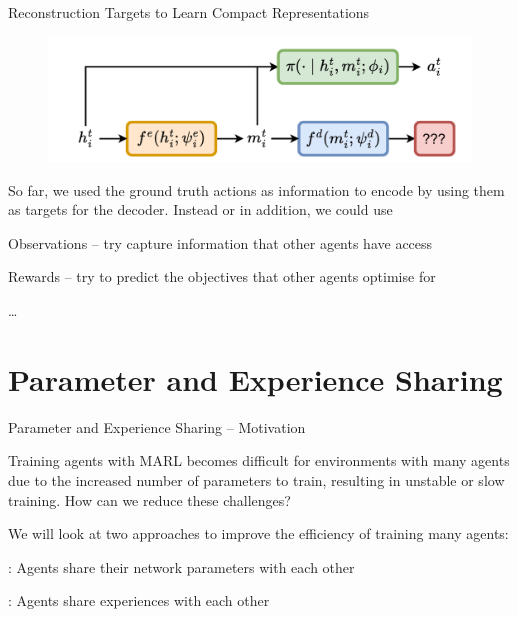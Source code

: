 \begin{frame}[t]{Reconstruction Targets to Learn Compact Representations}
    \begin{figure}
        \centering
        \includegraphics[width=.65\textwidth]{images/agent_modelling_encoder_decoder_targets.pdf}
    \end{figure}

    \vspace{-2em}

    \begin{notebox}
        So far, we used the ground truth actions as information to encode by using them as targets for the decoder. Instead or in addition, we could use
        \blist
            \item Observations -- try capture information that other agents have access
            \item Rewards -- try to predict the objectives that other agents optimise for
            \item \ldots
        \elist
    \end{notebox}
\end{frame}

\section{Parameter and Experience Sharing}

\begin{frame}[t]{Parameter and Experience Sharing -- Motivation}
    \begin{problembox}
        Training agents with MARL becomes difficult for environments with many agents due to the increased number of parameters to train, resulting in unstable or slow training. How can we reduce these challenges?
    \end{problembox}

    \pause

    \begin{solutionbox}
        We will look at two approaches to improve the efficiency of training many agents:
        \blist
            \item {}: Agents share their network parameters with each other
            \item {}: Agents share experiences with each other
        \elist
    \end{solutionbox}
\end{frame}


